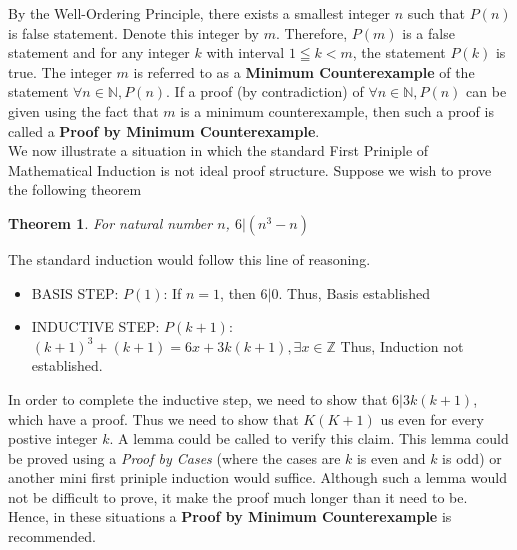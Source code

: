 \documentclass{book}
\newtheorem{theorem}{Theorem}[section]
\theoremstyle{definition}
\theoremstyle{remark}
\newcommand{\bb}[1]{\mathbb{#1}}
\begin{document}
By the Well-Ordering Principle, there exists a smallest integer $n$ such that $P(n)$ is false statement. Denote this integer by $m$. Therefore, $P(m)$ is a false statement and for any integer $k$ with interval $1 \leqq k < m$, the statement $P(k)$ is true. The integer $m$ is referred to as a \textbf{Minimum Counterexample} of the statement $\forall n \in \bb{N}, P(n)$. If a proof (by contradiction) of $\forall n \in \bb{N}, P(n)$ can be given using the fact that $m$ is a minimum counterexample, then such a proof is called a \textbf{Proof by Minimum Counterexample}. \\

We now illustrate a situation in which the standard First Priniple of Mathematical Induction is not ideal proof structure. Suppose we wish to prove the following theorem
    \begin{theorem}
        For natural number $n$, $6 | (n^3 - n)$
    \end{theorem}
The standard induction would follow this line of reasoning.
    \begin{itemize}
        \item BASIS STEP: $P(1)$: If $n=1$, then $6 | 0$. Thus, Basis established
        \item INDUCTIVE STEP: $P(k+1)$: $(k+1)^3 + (k+1) = 6x + 3k(k+1), \exists x \in \bb{Z}$ Thus, Induction not established.  
    \end{itemize}
In order to complete the inductive step, we need to show that $6 | 3k(k+1)$, which have a proof. Thus we need to show that $K(K+1)$ us even for every postive integer $k$. A lemma could be called to verify this claim. This lemma could be proved using a \textit{Proof by Cases} (where the cases are $k$ is even and $k$ is odd) or another mini first priniple induction would suffice. Although such a lemma would not be difficult to prove, it make the proof much longer than it  need to be. Hence, in these situations a \textbf{Proof by Minimum Counterexample} is recommended. 
\end{document}
